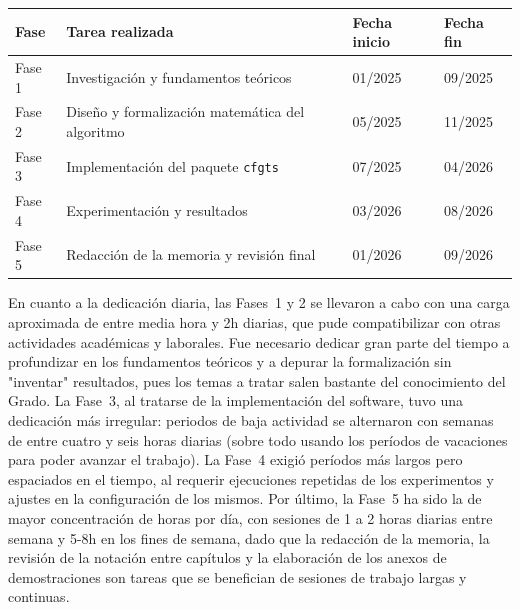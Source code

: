 \documentclass[12pt]{report} %
\begin{document}
\begin{table}[H]
    {\begin{tabular}{|p{1.6cm}|p{6.4cm}|p{2.2cm}|p{2.2cm}|}
            \hline
            \textbf{Fase} & \textbf{Tarea realizada}                        & \textbf{Fecha inicio} & \textbf{Fecha fin} \\
            \hline
            Fase 1        & Investigación y fundamentos teóricos            & 01/2025               & 09/2025            \\
            \hline
            Fase 2        & Diseño y formalización matemática del algoritmo & 05/2025               & 11/2025            \\
            \hline
            Fase 3        & Implementación del paquete \texttt{cfgts}       & 07/2025               & 04/2026            \\
            \hline
            Fase 4        & Experimentación y resultados                    & 03/2026               & 08/2026            \\
            \hline
            Fase 5        & Redacción de la memoria y revisión final        & 01/2026               & 09/2026            \\
            \hline
        \end{tabular}}
\end{table}

En cuanto a la dedicación diaria, las Fases~1 y 2 se llevaron a cabo con una carga aproximada de entre media hora y 2h diarias, que pude compatibilizar con otras actividades académicas y laborales. Fue necesario dedicar gran parte del tiempo a profundizar en los fundamentos teóricos y a depurar la formalización sin "inventar" resultados, pues los temas a tratar salen bastante del conocimiento del Grado. La Fase~3, al tratarse de la implementación del software, tuvo una dedicación más irregular: periodos de baja actividad se alternaron con semanas de entre cuatro y seis horas diarias (sobre todo usando los períodos de vacaciones para poder avanzar el trabajo). La Fase~4 exigió períodos más largos pero espaciados en el tiempo, al requerir ejecuciones repetidas de los experimentos y ajustes en la configuración de los mismos. Por último, la Fase~5 ha sido la de mayor concentración de horas por día, con sesiones de 1 a 2 horas diarias entre semana y 5-8h en los fines de semana, dado que la redacción de la memoria, la revisión de la notación entre capítulos y la elaboración de los anexos de demostraciones son tareas que se benefician de sesiones de trabajo largas y continuas.
\end{document}
